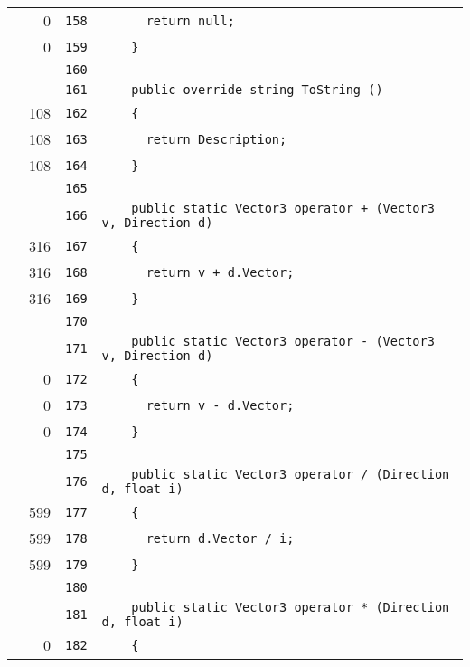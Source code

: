 \documentclass[a4paper,10pt]{article}
\begin{document}
\begin{longtable}[l]{lrrl}
\cellcolor{red} & 0 & \verb~158~ & \verb~      return null;~\\
\cellcolor{red} & 0 & \verb~159~ & \verb~    }~\\
\cellcolor{gray} &  & \verb~160~ & \verb~~\\
\cellcolor{gray} &  & \verb~161~ & \verb~    public override string ToString ()~\\
\cellcolor{green} & 108 & \verb~162~ & \verb~    {~\\
\cellcolor{green} & 108 & \verb~163~ & \verb~      return Description;~\\
\cellcolor{green} & 108 & \verb~164~ & \verb~    }~\\
\cellcolor{gray} &  & \verb~165~ & \verb~~\\
\cellcolor{gray} &  & \verb~166~ & \verb~    public static Vector3 operator + (Vector3 v, Direction d)~\\
\cellcolor{green} & 316 & \verb~167~ & \verb~    {~\\
\cellcolor{green} & 316 & \verb~168~ & \verb~      return v + d.Vector;~\\
\cellcolor{green} & 316 & \verb~169~ & \verb~    }~\\
\cellcolor{gray} &  & \verb~170~ & \verb~~\\
\cellcolor{gray} &  & \verb~171~ & \verb~    public static Vector3 operator - (Vector3 v, Direction d)~\\
\cellcolor{red} & 0 & \verb~172~ & \verb~    {~\\
\cellcolor{red} & 0 & \verb~173~ & \verb~      return v - d.Vector;~\\
\cellcolor{red} & 0 & \verb~174~ & \verb~    }~\\
\cellcolor{gray} &  & \verb~175~ & \verb~~\\
\cellcolor{gray} &  & \verb~176~ & \verb~    public static Vector3 operator / (Direction d, float i)~\\
\cellcolor{green} & 599 & \verb~177~ & \verb~    {~\\
\cellcolor{green} & 599 & \verb~178~ & \verb~      return d.Vector / i;~\\
\cellcolor{green} & 599 & \verb~179~ & \verb~    }~\\
\cellcolor{gray} &  & \verb~180~ & \verb~~\\
\cellcolor{gray} &  & \verb~181~ & \verb~    public static Vector3 operator * (Direction d, float i)~\\
\cellcolor{red} & 0 & \verb~182~ & \verb~    {~\\

\end{longtable}
\end{document}
